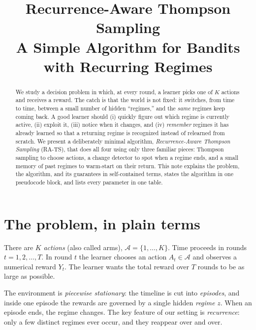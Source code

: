 \documentclass[11pt]{article}
\title{Recurrence-Aware Thompson Sampling\\
\large A Simple Algorithm for Bandits with Recurring Regimes}
\author{}
\date{}
\newcommand{\A}{\mathcal A}
\begin{document}
\maketitle

\begin{abstract}
We study a decision problem in which, at every round, a learner picks one of $K$ actions and
receives a reward. The catch is that the world is not fixed: it switches, from time to time,
between a small number of hidden ``regimes,'' and the \emph{same} regimes keep coming back.
A good learner should (i) quickly figure out which regime is currently active, (ii) exploit it,
(iii) notice when it changes, and (iv) \emph{remember} regimes it has already learned so that a
returning regime is recognized instead of relearned from scratch. We present a deliberately
minimal algorithm, \emph{Recurrence-Aware Thompson Sampling} (RA-TS), that does all four using
only three familiar pieces: Thompson sampling to choose actions, a change detector to spot when
a regime ends, and a small memory of past regimes to warm-start on their return. This note
explains the problem, the algorithm, and its guarantees in self-contained terms, states the
algorithm in one pseudocode block, and lists every parameter in one table.
\end{abstract}

\section{The problem, in plain terms}
\label{sec:problem}

There are $K$ \emph{actions} (also called arms), $\A=\{1,\dots,K\}$. Time proceeds in rounds
$t=1,2,\dots,T$. In round $t$ the learner chooses an action $A_t\in\A$ and observes a numerical
reward $Y_t$. The learner wants the total reward over $T$ rounds to be as large as possible.

The environment is \emph{piecewise stationary}: the timeline is cut into \emph{episodes}, and
inside one episode the rewards are governed by a single hidden \emph{regime} $z$. When an episode
ends, the regime changes. The key feature of our setting is \emph{recurrence}: only a few
distinct regimes ever occur, and they reappear over and over.
\end{document}
